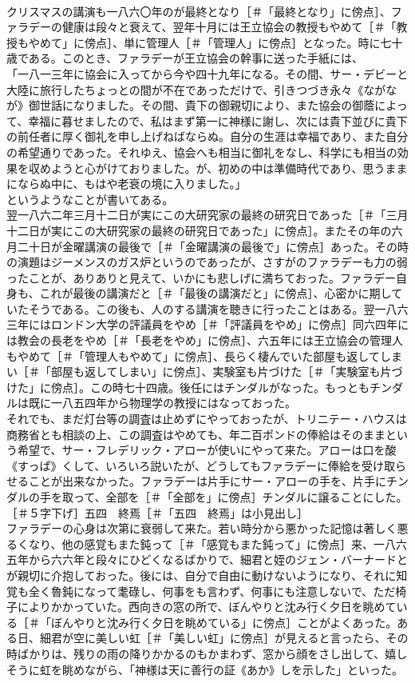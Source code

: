 \documentclass[8pt]{extreport}
\begin{document}
\begin{CJK}{UTF8}{min}
\\	クリスマスの講演も一八六〇年のが最終となり［＃「最終となり」に傍点］、ファラデーの健康は段々と衰えて、翌年十月には王立協会の教授もやめて［＃「教授もやめて」に傍点］、単に管理人［＃「管理人」に傍点］となった。時に七十歳である。このとき、ファラデーが王立協会の幹事に送った手紙には、
\\	「一八一三年に協会に入ってから今や四十九年になる。その間、サー・デビーと大陸に旅行したちょっとの間が不在であっただけで、引きつづき永々《ながなが》御世話になりました。その間、貴下の御親切により、また協会の御蔭によって、幸福に暮せましたので、私はまず第一に神様に謝し、次には貴下並びに貴下の前任者に厚く御礼を申し上げねばならぬ。自分の生涯は幸福であり、また自分の希望通りであった。それゆえ、協会へも相当に御礼をなし、科学にも相当の効果を収めようと心がけておりました。が、初めの中は準備時代であり、思うままにならぬ中に、もはや老衰の境に入りました。」
\\	というようなことが書いてある。
\\	翌一八六二年三月十二日が実にこの大研究家の最終の研究日であった［＃「三月十二日が実にこの大研究家の最終の研究日であった」に傍点］。またその年の六月二十日が金曜講演の最後で［＃「金曜講演の最後で」に傍点］あった。その時の演題はジーメンスのガス炉というのであったが、さすがのファラデーも力の弱ったことが、ありありと見えて、いかにも悲しげに満ちておった。ファラデー自身も、これが最後の講演だと［＃「最後の講演だと」に傍点］、心密かに期していたそうである。この後も、人のする講演を聴きに行ったことはある。翌一八六三年にはロンドン大学の評議員をやめ［＃「評議員をやめ」に傍点］同六四年には教会の長老をやめ［＃「長老をやめ」に傍点］、六五年には王立協会の管理人もやめて［＃「管理人もやめて」に傍点］、長らく棲んでいた部屋も返してしまい［＃「部屋も返してしまい」に傍点］、実験室も片づけた［＃「実験室も片づけた」に傍点］。この時七十四歳。後任にはチンダルがなった。もっともチンダルは既に一八五四年から物理学の教授にはなっておった。
\\	それでも、まだ灯台等の調査は止めずにやっておったが、トリニテー・ハウスは商務省とも相談の上、この調査はやめても、年二百ポンドの俸給はそのままという希望で、サー・フレデリック・アローが使いにやって来た。アローは口を酸《すっぱ》くして、いろいろ説いたが、どうしてもファラデーに俸給を受け取らせることが出来なかった。ファラデーは片手にサー・アローの手を、片手にチンダルの手を取って、全部を［＃「全部を」に傍点］チンダルに譲ることにした。
\\	［＃５字下げ］五四　終焉［＃「五四　終焉」は小見出し］
\\	ファラデーの心身は次第に衰弱して来た。若い時分から悪かった記憶は著しく悪るくなり、他の感覚もまた鈍って［＃「感覚もまた鈍って」に傍点］来、一八六五年から六六年と段々にひどくなるばかりで、細君と姪のジェン・バーナードとが親切に介抱しておった。後には、自分で自由に動けないようになり、それに知覚も全く魯鈍になって耄碌し、何事をも言わず、何事にも注意しないで、ただ椅子によりかかっていた。西向きの窓の所で、ぼんやりと沈み行く夕日を眺めている［＃「ぼんやりと沈み行く夕日を眺めている」に傍点］ことがよくあった。ある日、細君が空に美しい虹［＃「美しい虹」に傍点］が見えると言ったら、その時ばかりは、残りの雨の降りかかるのもかまわず、窓から顔をさし出して、嬉しそうに虹を眺めながら、「神様は天に善行の証《あか》しを示した」といった。

\end{CJK}
\end{document}
